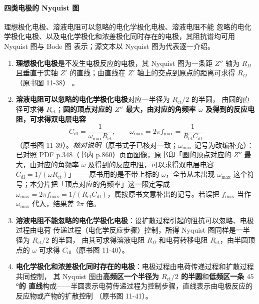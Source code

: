 \paragraph{四类电极的 Nyquist 图} 理想极化电极、溶液电阻可以忽略的电化学极化电极、溶液电阻不能
忽略的电化学极化电极、以及电化学极化和浓差极化同时存在的电极，其阻抗谱均可用 Nyquist 图与 Bode 图
表示；源文本以 Nyquist 图为代表逐一介绍。

\begin{enumerate}
\item \textbf{理想极化电极}是不发生电极反应的电极，其 Nyquist 图为一条距 $Z''$ 轴为 $R_{\Omega}$
且垂直于实轴 $Z'$ 的直线；由直线在 $Z'$ 轴上的交点到原点的距离可求得 $R_{\Omega}$（原书图 11-38）
。
\item \textbf{溶液电阻可以忽略的电化学极化电极}对应一半径为 $R_{\mathrm{ct}}/2$ 的半圆，
由圆的直径可求得 $R_{\mathrm{ct}}$；\textbf{圆的顶点对应的 $Z''$ 最大，由对应的角频率 $\omega$
及得到的反应电阻，可求得双电层电容}
\begin{equation}
C_{\mathrm{dl}}=\frac{1}{\omega_{\max}R_{\mathrm{ct}}},
\qquad
\omega_{\max}=2\pi f_{\max}=\frac{1}{R_{\mathrm{ct}}C_{\mathrm{dl}}}
\label{eq:eis-d-cdl}
\end{equation}
（原书图 11-39）。\emph{核对说明}（原书式子已核对一致；$\omega_{\max}$ 记号为改编补充）：已对照 PDF p.348（书内 p.860）页面图像，原书印「圆的顶点对应的 $Z''$ 最大，由对应的角频率 $\omega$ 及得到的反应电阻，可以求得双电层电容 $C_{\mathrm{dl}}=1/(\omega R_{\mathrm{ct}})$」——原书用的是不带上标的 $\omega$，全节从未出现 $\omega_{\max}$ 这个符号；本分片把「顶点对应的角频率」这一限定写成 $\omega_{\max}=2\pi f_{\max}=1/(R_{\mathrm{ct}}C_{\mathrm{dl}})$，属按原书文意补出的记号。若误把 $f_{\max}$ 当作 $\omega_{\max}$ 代入，结果差 $2\pi$ 倍。
\item \textbf{溶液电阻不能忽略的电化学极化电极}：设扩散过程引起的阻抗可以忽略、电极过程由电荷
传递过程（电化学反应步骤）控制，所得 Nyquist 图同样是一半径为 $R_{\mathrm{ct}}/2$ 的半圆，
由其可求得溶液电阻 $R_{\Omega}$ 和电荷转移电阻 $R_{\mathrm{ct}}$，由半圆顶点的 $\omega$ 可求得
$C_{\mathrm{dl}}$（原书图 11-40）。
\item \textbf{电化学极化和浓差极化同时存在的电极}：电极过程由电荷传递过程和扩散过程共同控制，
其 Nyquist 图由\textbf{高频区一个半径为 $R_{\mathrm{ct}}/2$ 的半圆}和\textbf{低频区一条 $45$°的
直线}构成——半圆表示电荷传递过程为控制步骤，直线表示由电极反应的反应物或产物的扩散控制
（原书图 11-41）。
\end{enumerate}

